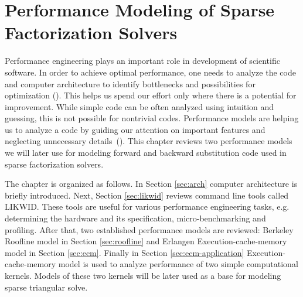 \chapter{Performance Modeling of Sparse Factorization Solvers}


Performance engineering plays an important role in development of scientific software. In order to achieve optimal performance, one needs to analyze the code and computer architecture to identify bottlenecks and possibilities for optimization (\cite{KöstlerRüde+2013+91+96,Minami2019}). This helps us spend our effort only where there is a potential for improvement.
While simple code can be often analyzed using intuition and guessing, this is not possible for nontrivial codes. Performance models are helping us to analyze a code by guiding our attention on important features and neglecting unnecessary details~(\cite{Gropp99,Williams:EECS-2008-164,KHWPAF14}).
%
%
%
This chapter reviews two performance models we will later use for modeling forward and backward substitution code used in sparse factorization solvers.

The chapter is organized as follows. In Section \ref{sec:arch} computer architecture is briefly introduced. Next, Section \ref{sec:likwid} reviews command line tools called LIKWID. These tools are useful for various performance engineering tasks, e.g. determining the hardware and its specification, micro-benchmarking and profiling. After that, two established performance models are reviewed: Berkeley Roofline model in Section \ref{sec:roofline} and Erlangen Execution-cache-memory model in Section \ref{sec:ecm}. Finally in Section \ref{sec:ecm-application} Execution-cache-memory model is used to analyze performance of two simple computational kernels. Models of these two kernels will be later used as a base for modeling sparse triangular solve.

